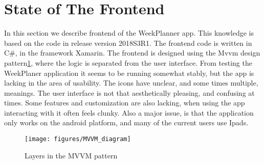 \section{State of The Frontend} \label{sec:StateFrontend}

In this section we describe frontend of the WeekPlanner app. This knowledge is based on the code in release version 2018S3R1. 
The frontend code is written in C\#, in the framework Xamarin. The frontend is designed using the \gls{Mvvm} design pattern\ref{fig:MVVM}, where the logic is separated from the user interface. 
From testing the WeekPlaner application it seems to be running somewhat stably,  but the app is lacking in the area of usability. The icons have unclear, and some times multiple, meanings. The user interface is not that aesthetically pleasing, and confusing at times. Some features and customization are also lacking, when using the app interacting with it often feels clunky.
Also a major issue, is that the application only works on the android platform, and many of the current users use Ipads.

\begin{figure}[ht]
    \begin{small}
        \begin{center}
            \texttt{[image: figures/MVVM\_diagram]}
        \end{center}
        \caption{Layers in the MVVM pattern}
        \label{fig:MVVM}
    \end{small}
\end{figure}

